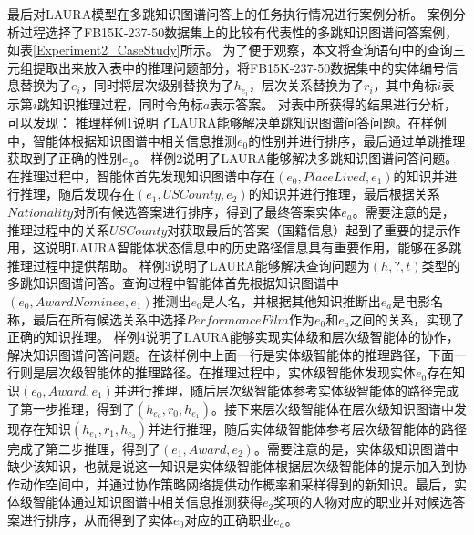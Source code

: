 \documentclass[algorithmlist, AutoFakeBold, AutoFakeSlant, figurelist, tablelist, nomlist, engineering]{seuthesix}
\begin{document}
最后对LAURA模型在多跳知识图谱问答上的任务执行情况进行案例分析。
案例分析过程选择了FB15K-237-50数据集上的比较有代表性的多跳知识图谱问答案例，如表\ref{Experiment2_CaseStudy}所示。
为了便于观察，本文将查询语句中的查询三元组提取出来放入表中的推理问题部分，将FB15K-237-50数据集中的实体编号信息替换为了$e_i$，同时将层次级别替换为了$h_{e_i}$，层次关系替换为了$r_i$，其中角标$i$表示第$i$跳知识推理过程，同时令角标$a$表示答案。
对表中所获得的结果进行分析，可以发现：
推理样例1说明了LAURA能够解决单跳知识图谱问答问题。在样例中，智能体根据知识图谱中相关信息推测$e_0$的性别并进行排序，最后通过单跳推理获取到了正确的性别$e_a$。
样例2说明了LAURA能够解决多跳知识图谱问答问题。在推理过程中，智能体首先发现知识图谱中存在$(e_0, PlaceLived, e_1)$的知识并进行推理，随后发现存在$(e_1, USCounty, e_2)$的知识并进行推理，最后根据关系$Nationality$对所有候选答案进行排序，得到了最终答案实体$e_a$。需要注意的是，推理过程中的关系$USCounty$对获取最后的答案（国籍信息）起到了重要的提示作用，这说明LAURA智能体状态信息中的历史路径信息具有重要作用，能够在多跳推理过程中提供帮助。
样例3说明了LAURA能够解决查询问题为$(h, ?, t)$类型的多跳知识图谱问答。查询过程中智能体首先根据知识图谱中$(e_0, AwardNominee, e_1)$推测出$e_0$是人名，并根据其他知识推断出$e_a$是电影名称，最后在所有候选关系中选择$PerformanceFilm$作为$e_0$和$e_a$之间的关系，实现了正确的知识推理。
样例4说明了LAURA能够实现实体级和层次级智能体的协作，解决知识图谱问答问题。在该样例中上面一行是实体级智能体的推理路径，下面一行则是层次级智能体的推理路径。在推理过程中，实体级智能体发现实体$e_0$存在知识$(e_0, Award, e_1)$并进行推理，随后层次级智能体参考实体级智能体的路径完成了第一步推理，得到了$(h_{e_0}, r_0, h_{e_1})$。接下来层次级智能体在层次级知识图谱中发现存在知识$(h_{e_1}, r_1, h_{e_2})$并进行推理，随后实体级智能体参考层次级智能体的路径完成了第二步推理，得到了$(e_1, Award, e_2)$。需要注意的是，实体级知识图谱中缺少该知识，也就是说这一知识是实体级智能体根据层次级智能体的提示加入到协作动作空间中，并通过协作策略网络提供动作概率和采样得到的新知识。最后，实体级智能体通过知识图谱中相关信息推测获得$e_2$奖项的人物对应的职业并对候选答案进行排序，从而得到了实体$e_0$对应的正确职业$e_a$。
\end{document}
